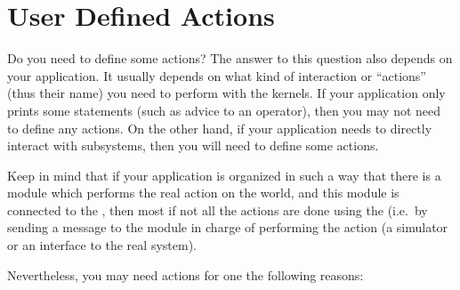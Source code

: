 \section{User Defined Actions}

Do you need to define some actions? The answer to this question also depends on
your 
application. It usually depends on what kind of interaction or
``actions'' (thus their name) you need to perform with the kernels.
If your application only prints some statements (such as advice to an
operator), then you may not need to define any actions. On the other hand,
if your application needs to directly interact with subsystems,
then you will need to define some actions.

Keep in mind that if your application is organized in such a way that
there is a module which performs the real action on the world, and this
module is connected to the \MPA{}, then most if not all the actions are
done using the \MPA{} (i.e.\ by sending a message to the module in charge
of performing the action (a simulator or an interface to the real system).

Nevertheless, you may need actions for one the following reasons:

